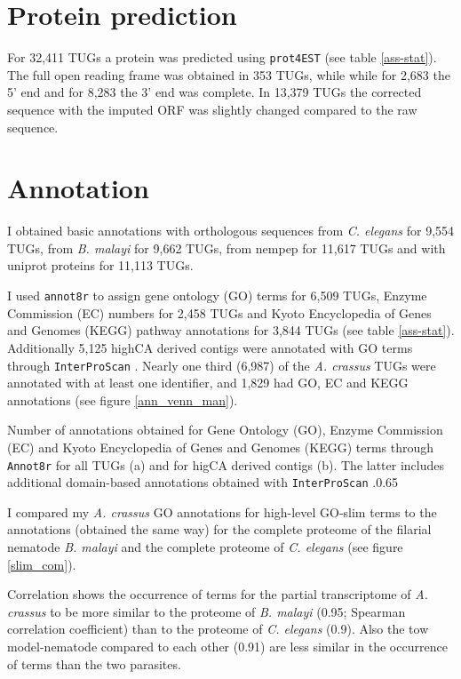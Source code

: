 \section{Protein prediction}

For 32,411 TUGs a protein was predicted using \texttt{prot4EST}
\cite{wasmuth_prot4est:_2004} (see table \ref{ass-stat}). The full
open reading frame was obtained in 353 TUGs, while while for 2,683 the
5' end and for 8,283 the 3' end was complete. In 13,379 TUGs the
corrected sequence with the imputed ORF was slightly changed compared
to the raw sequence.

\section{Annotation}
\label{454-annot}

I obtained basic annotations with orthologous sequences from
\textit{C. elegans} for 9,554 TUGs, from \textit{B. malayi} for 9,662
TUGs, from nempep \cite{parkinson_nembase:resource_2004, pmid21550347}
for 11,617 TUGs and with uniprot proteins for 11,113 TUGs.

I used \texttt{annot8r} \cite{schmid_annot8r:_2008} to assign gene
ontology (GO) terms for 6,509 TUGs, Enzyme Commission (EC) numbers for
2,458 TUGs and Kyoto Encyclopedia of Genes and Genomes (KEGG) pathway
annotations for 3,844 TUGs (see table \ref{ass-stat}). Additionally
5,125 highCA derived contigs were annotated with GO terms through
\texttt{InterProScan} \cite{pmid11590104}. Nearly one third (6,987) of
the \textit{A. crassus} TUGs were annotated with at least one
identifier, and 1,829 had GO, EC and KEGG annotations (see figure
\ref{ann_venn_man}).

 {Number
  of annotations obtained for Gene Ontology (GO), Enzyme Commission
  (EC) and Kyoto Encyclopedia of Genes and Genomes (KEGG) terms
  through \texttt{Annot8r} \cite{schmid_annot8r:_2008} for all TUGs
  (a) and for higCA derived contigs (b). The latter includes
  additional domain-based annotations obtained with
  \texttt{InterProScan} \cite{pmid11590104}.}{0.65}

I compared my \textit{A. crassus} GO annotations for high-level
GO-slim terms to the annotations (obtained the same way) for the
complete proteome of the filarial nematode \textit{B. malayi} and the
complete proteome of \textit{C. elegans} (see figure \ref{slim_com}).

Correlation shows the occurrence of terms for the partial
transcriptome of \textit{A. crassus} to be more similar to the
proteome of \textit{B. malayi} (0.95; Spearman correlation
coefficient) than to the proteome of \textit{C. elegans} (0.9). Also
the tow model-nematode compared to each other (0.91) are less similar
in the occurrence of terms than the two parasites.

